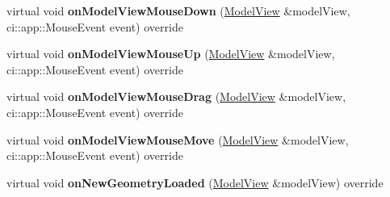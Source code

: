 \begin{DoxyCompactItemize}
virtual void {\bfseries on\+Model\+View\+Mouse\+Down} (\mbox{\hyperlink{classpepr3d_1_1_model_view}{Model\+View}} \&model\+View, ci\+::app\+::\+Mouse\+Event event) override
\item 
\mbox{\label{classpepr3d_1_1_triangle_painter_a896ecc3264191911cb5f960fe983453e}} 
virtual void {\bfseries on\+Model\+View\+Mouse\+Up} (\mbox{\hyperlink{classpepr3d_1_1_model_view}{Model\+View}} \&model\+View, ci\+::app\+::\+Mouse\+Event event) override
\item 
\mbox{\label{classpepr3d_1_1_triangle_painter_ada44c24799296b71b5f2d46651921343}} 
virtual void {\bfseries on\+Model\+View\+Mouse\+Drag} (\mbox{\hyperlink{classpepr3d_1_1_model_view}{Model\+View}} \&model\+View, ci\+::app\+::\+Mouse\+Event event) override
\item 
\mbox{\label{classpepr3d_1_1_triangle_painter_a3d19c5d44381645259c63d51452ce464}} 
virtual void {\bfseries on\+Model\+View\+Mouse\+Move} (\mbox{\hyperlink{classpepr3d_1_1_model_view}{Model\+View}} \&model\+View, ci\+::app\+::\+Mouse\+Event event) override
\item 
\mbox{\label{classpepr3d_1_1_triangle_painter_a988c5e1fa7d556d013ebffae277b6bd7}} 
virtual void {\bfseries on\+New\+Geometry\+Loaded} (\mbox{\hyperlink{classpepr3d_1_1_model_view}{Model\+View}} \&model\+View) override
\end{DoxyCompactItemize}

